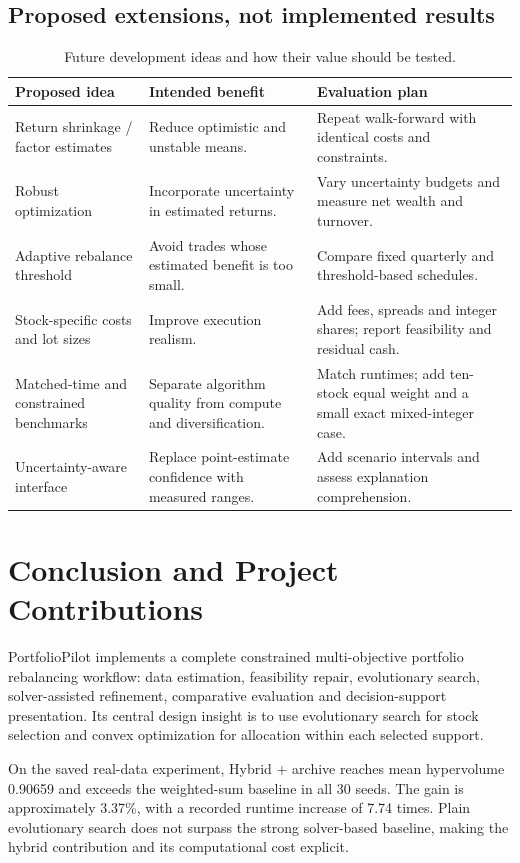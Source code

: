 \documentclass[12pt,a4paper]{article}
\newcommand{\newsec}[1]{\section{#1}}
\begin{document}
\subsection{Proposed extensions, not implemented results}
\begin{table}[H]\centering\small
\begin{tabularx}{\linewidth}{@{}p{38mm}YY@{}}\toprule
Proposed idea & Intended benefit & Evaluation plan\\\midrule
Return shrinkage / factor estimates & Reduce optimistic and unstable means. & Repeat walk-forward with identical costs and constraints.\\
Robust optimization & Incorporate uncertainty in estimated returns. & Vary uncertainty budgets and measure net wealth and turnover.\\
Adaptive rebalance threshold & Avoid trades whose estimated benefit is too small. & Compare fixed quarterly and threshold-based schedules.\\
Stock-specific costs and lot sizes & Improve execution realism. & Add fees, spreads and integer shares; report feasibility and residual cash.\\
Matched-time and constrained benchmarks & Separate algorithm quality from compute and diversification. & Match runtimes; add ten-stock equal weight and a small exact mixed-integer case.\\
Uncertainty-aware interface & Replace point-estimate confidence with measured ranges. & Add scenario intervals and assess explanation comprehension.\\\bottomrule
\end{tabularx}
\caption{Future development ideas and how their value should be tested.}
\end{table}

\newsec{Conclusion and Project Contributions}
PortfolioPilot implements a complete constrained multi-objective portfolio rebalancing workflow: data estimation, feasibility repair, evolutionary search, solver-assisted refinement, comparative evaluation and decision-support presentation. Its central design insight is to use evolutionary search for stock selection and convex optimization for allocation within each selected support.

On the saved real-data experiment, Hybrid + archive reaches mean hypervolume 0.90659 and exceeds the weighted-sum baseline in all 30 seeds. The gain is approximately 3.37\%, with a recorded runtime increase of 7.74 times. Plain evolutionary search does not surpass the strong solver-based baseline, making the hybrid contribution and its computational cost explicit.
\end{document}
